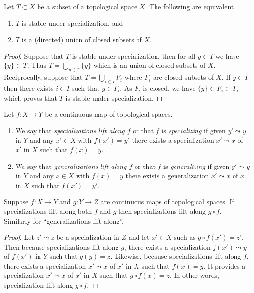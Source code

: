 \begin{lemma}
\label{lemma-stable-specialization}
Let $T \subset X$ be a subset of a topological space $X$.
The following are equivalent
\begin{enumerate}
\item $T$ is stable under specialization, and
\item $T$ is a (directed) union of closed subsets of $X$.
\end{enumerate}
\end{lemma}

\begin{proof}
Suppose that $T$ is stable under specialization, then for all $y\in T$ we have
$\overline{\{y\}} \subset T$. Thus $T = \bigcup_{y\in T} \overline{\{y\}}$
which is an union of closed subsets of $X$. Reciprocally, suppose that $T =
\bigcup_{i\in I}F_i$ where $F_i$ are closed subsets of $X$. If $y\in T$ then
there exists $i\in I$ such that $y\in F_i$. As $F_i$ is closed, we have
$\overline{\{y\}} \subset F_i \subset T$, which proves that $T$ is stable under
specialization.
\end{proof}

\begin{definition}
\label{definition-lift-specializations}
Let $f : X \to Y$ be a continuous map of topological spaces.
\begin{enumerate}
\item We say that {\it specializations lift along $f$} or that $f$ is
{\it specializing} if given $y' \leadsto y$ in $Y$ and any $x'\in X$ with
$f(x') = y'$ there exists a specialization $x' \leadsto x$ of $x'$ in $X$ such
that $f(x) = y$.
\item We say that {\it generalizations lift along $f$} or that $f$ is
{\it generalizing} if given $y' \leadsto y$ in $Y$ and any $x\in X$ with
$f(x) = y$ there exists a generalization $x' \leadsto x$ of $x$ in $X$ such
that $f(x') = y'$.
\end{enumerate}
\end{definition}

\begin{lemma}
\label{lemma-lift-specialization-composition}
Suppose $f : X \to Y$ and $g : Y \to Z$ are continuous maps
of topological spaces. If specializations lift along both $f$ and $g$
then specializations lift along $g \circ f$. Similarly for
``generalizations lift along''.
\end{lemma}

\begin{proof}
Let $z'\leadsto z$ be a specialization in $Z$ and let $x' \in X$ such as
$g\circ f (x') = z'$. Then because specializations lift along $g$, there exists
a specialization $f(x') \leadsto y$ of $f(x')$ in $Y$ such that $g(y) = z$.
Likewise, because specializations lift along $f$, there exists a specialization
$x' \leadsto x$ of $x'$ in $X$ such that $f(x) = y$. It provides a
specialization $x' \leadsto x$ of $x'$ in $X$ such that $g\circ f(x) = z$. In
other words, specialization lift along $g\circ f$.
\end{proof}

